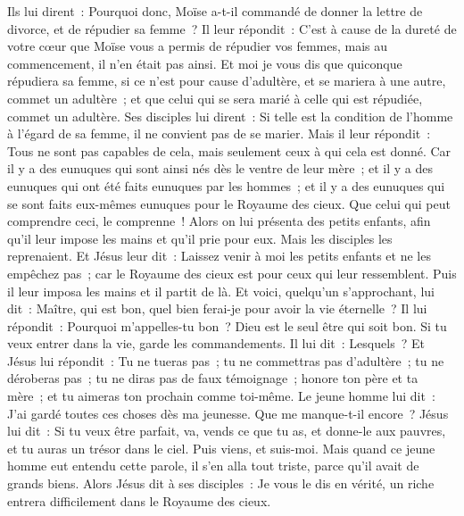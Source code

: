 \begin{multicols}{2}
Ils lui dirent~: Pourquoi donc, Moïse a-t-il commandé de donner la lettre de divorce, et de répudier sa femme~?
Il leur répondit~: C'est à cause de la dureté de votre cœur que Moïse vous a permis de répudier vos femmes, mais au commencement, il n'en était pas ainsi.
Et moi je vous dis que quiconque répudiera sa femme, si ce n'est pour cause d'adultère, et se mariera à une autre, commet un adultère~; et que celui qui se sera marié à celle qui est répudiée, commet un adultère.
Ses disciples lui dirent~: Si telle est la condition de l'homme à l'égard de sa femme, il ne convient pas de se marier.
Mais il leur répondit~: Tous ne sont pas capables de cela, mais seulement ceux à qui cela est donné.
Car il y a des eunuques qui sont ainsi nés dès le ventre de leur mère~; et il y a des eunuques qui ont été faits eunuques par les hommes~; et il y a des eunuques qui se sont faits eux-mêmes eunuques pour le Royaume des cieux. Que celui qui peut comprendre ceci, le comprenne~!
Alors on lui présenta des petits enfants, afin qu'il leur impose les mains et qu'il prie pour eux. Mais les disciples les reprenaient.
Et Jésus leur dit~: Laissez venir à moi les petits enfants et ne les empêchez pas~; car le Royaume des cieux est pour ceux qui leur ressemblent.
Puis il leur imposa les mains et il partit de là.
Et voici, quelqu'un s'approchant, lui dit~: Maître, qui est bon, quel bien ferai-je pour avoir la vie éternelle~?
Il lui répondit~: Pourquoi m'appelles-tu bon~? Dieu est le seul être qui soit bon. Si tu veux entrer dans la vie, garde les commandements.
Il lui dit~: Lesquels~? Et Jésus lui répondit~: Tu ne tueras pas~; tu ne commettras pas d'adultère~; tu ne déroberas pas~; tu ne diras pas de faux témoignage~;
honore ton père et ta mère~; et tu aimeras ton prochain comme toi-même.
Le jeune homme lui dit~: J'ai gardé toutes ces choses dès ma jeunesse. Que me manque-t-il encore~?
Jésus lui dit~: Si tu veux être parfait, va, vends ce que tu as, et donne-le aux pauvres, et tu auras un trésor dans le ciel. Puis viens, et suis-moi.
Mais quand ce jeune homme eut entendu cette parole, il s'en alla tout triste, parce qu'il avait de grands biens.
Alors Jésus dit à ses disciples~: Je vous le dis en vérité, un riche entrera difficilement dans le Royaume des cieux.

\end{multicols}
